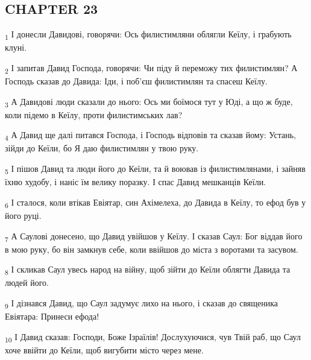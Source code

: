\subsection{CHAPTER 23}
\begin{tcolorbox}
\textsubscript{1} І донесли Давидові, говорячи: Ось филистимляни облягли Кеїлу, і грабують клуні.
\end{tcolorbox}
\begin{tcolorbox}
\textsubscript{2} І запитав Давид Господа, говорячи: Чи піду й переможу тих филистимлян? А Господь сказав до Давида: Іди, і поб'єш филистимлян та спасеш Кеїлу.
\end{tcolorbox}
\begin{tcolorbox}
\textsubscript{3} А Давидові люди сказали до нього: Ось ми боїмося тут у Юді, а що ж буде, коли підемо в Кеїлу, проти филистимських лав?
\end{tcolorbox}
\begin{tcolorbox}
\textsubscript{4} А Давид ще далі питався Господа, і Господь відповів та сказав йому: Устань, зійди до Кеїли, бо Я даю филистимлян у твою руку.
\end{tcolorbox}
\begin{tcolorbox}
\textsubscript{5} І пішов Давид та люди його до Кеїли, та й воював із филистимлянами, і зайняв їхню худобу, і наніс їм велику поразку. І спас Давид мешканців Кеїли.
\end{tcolorbox}
\begin{tcolorbox}
\textsubscript{6} І сталося, коли втікав Евіятар, син Ахімелеха, до Давида в Кеїлу, то ефод був у його руці.
\end{tcolorbox}
\begin{tcolorbox}
\textsubscript{7} А Саулові донесено, що Давид увійшов у Кеїлу. І сказав Саул: Бог віддав його в мою руку, бо він замкнув себе, коли ввійшов до міста з воротами та засувом.
\end{tcolorbox}
\begin{tcolorbox}
\textsubscript{8} І скликав Саул увесь народ на війну, щоб зійти до Кеїли облягти Давида та людей його.
\end{tcolorbox}
\begin{tcolorbox}
\textsubscript{9} І дізнався Давид, що Саул задумує лихо на нього, і сказав до священика Евіятара: Принеси ефода!
\end{tcolorbox}
\begin{tcolorbox}
\textsubscript{10} І Давид сказав: Господи, Боже Ізраїлів! Дослухуючися, чув Твій раб, що Саул хоче ввійти до Кеїли, щоб вигубити місто через мене.
\end{tcolorbox}
